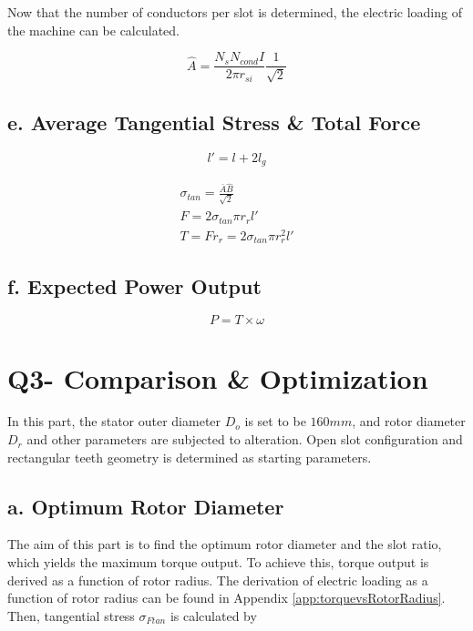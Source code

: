 \documentclass[a4paper, 11pt, titlepage]{article}
\begin{document}
Now that the number of conductors per slot is determined, the electric loading of the machine can be calculated.

\begin{equation}
	\hat{A} = \frac{N_sN_{cond}I}{2\pi r_{si}}\frac{1}{\sqrt{2}}
	\label{eq:specificElectricLoading}
\end{equation}

\subsection{e. Average Tangential Stress \& Total Force}

\begin{equation}
	l'=l+2l_g
	\label{eq:effectiveAxialLength}
\end{equation}


\begin{eqnarray}
	\sigma_{tan} = \frac{\bar{A}\hat{B}}{\sqrt{2}} \\
	F = 2\sigma_{tan}\pi r_{r}l' \\
	T = Fr_{r}= 2\sigma_{tan}\pi r^2_{r}l'
	\label{eq:torqueOutput}
\end{eqnarray}

\subsection{f. Expected Power Output}

\begin{equation}
	P=T\times\omega
\end{equation}


\section{Q3- Comparison \& Optimization}

In this part, the stator outer diameter $D_o$ is set to be $160mm$, and rotor diameter $D_r$ and other parameters are subjected to alteration. Open slot configuration and rectangular teeth geometry is determined as starting parameters. 


\subsection{a. Optimum Rotor Diameter}
The aim of this part is to find the optimum rotor diameter and the slot ratio, which yields the maximum torque output. To achieve this, torque output is derived as a function of rotor radius. The derivation of electric loading as a function of rotor radius can be found in Appendix \ref{app:torquevsRotorRadius}. Then, tangential stress $\sigma_{Ftan}$ is calculated by
\end{document}
